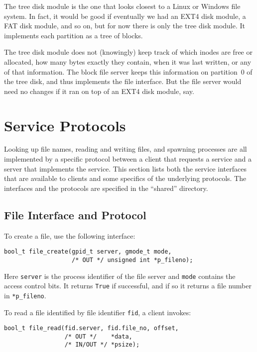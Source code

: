 \documentclass{article}
\begin{document}
The tree disk module is the one that looks closest to a Linux or
Windows file system.  In fact, it would be good if eventually we had
an EXT4 disk module, a FAT disk module, and so on, but for now there
is only the tree disk module.  It implements each partition as a tree of
blocks.

The tree disk module does not (knowingly) keep track of which inodes are
free or allocated, how many bytes exactly they contain, when it was last
written, or any of that information.  The block file server keeps this
information on partition~0 of the tree disk, and thus implements the file
interface.  But the file server would need no changes if it ran on top
of an EXT4 disk module, say.

\section{Service Protocols}

Looking up file names, reading and writing files, and spawning processes
are all implemented by a specific protocol between a client that
requests a service and a server that implements the service.
This section lists both the service interfaces that are available to
clients and some specifics of the underlying protocols.
The interfaces and the protocols are specified in the ``shared'' directory.

\subsection{File Interface and Protocol}

To create a file, use the following interface:

\begin{verbatim}
bool_t file_create(gpid_t server, gmode_t mode,
                   /* OUT */ unsigned int *p_fileno);
\end{verbatim}

Here \texttt{server} is the process identifier of the file server
and \texttt{mode} contains the access control bits.
It returns \texttt{True} if successful, and if so it returns a file number in \texttt{*p\_fileno}.

To read a file identified by file identifier \texttt{fid}, a client invokes:

\begin{verbatim}
bool_t file_read(fid.server, fid.file_no, offset,
                 /* OUT */    *data,
                 /* IN/OUT */ *psize);
\end{verbatim}
\end{document}
